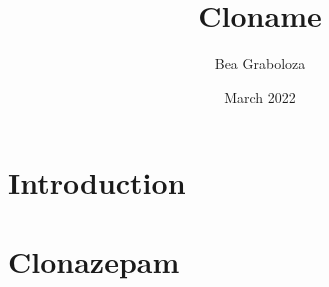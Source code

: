 \documentclass{article}
\title{Cloname}
\author{Bea Graboloza}
\date{March 2022}
\makeatletter
\let\docTitle\@title
\makeatother
\begin{document}
\thispagestyle{empty}

\renderHeader{\logo}{\courseID}{\courseName}{\city}{\country}

\begin{center}
    \renderTitle[\docSubtitle]{\docTitle}
\end{center}

\pagestyle{fancy}

\newpage

\section{Introduction}

\section{Clonazepam}
\end{document}
